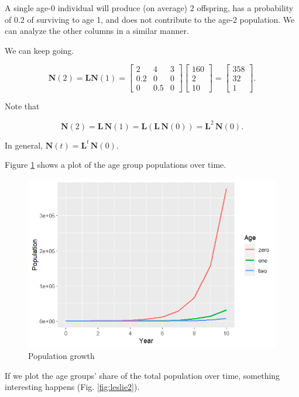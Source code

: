 \documentclass[
]{book}
\theoremstyle{definition}
\theoremstyle{definition}
\theoremstyle{definition}
\theoremstyle{definition}
\theoremstyle{remark}
\begin{document}
A single age-0 individual will produce (on average) 2 offspring, has a probability of 0.2 of surviving to age 1, and does not contribute to the age-2 population. We can analyze the other columns in a similar manner.

We can keep going.

\[\mathbf{N}(2)=\mathbf{L}\mathbf{N}(1)=\begin{bmatrix}2&4&3\\0.2&0&0\\0&0.5&0\end{bmatrix}\begin{bmatrix}160\\2\\10\end{bmatrix}=\begin{bmatrix}358\\32\\1\end{bmatrix}.\]

Note that

\[\mathbf{N}(2)=\mathbf{L}\,\mathbf{N}(1)=\mathbf{L}(\mathbf{L}\,\mathbf{N}(0))=\mathbf{L}^2\,\mathbf{N}(0).\]

In general, \(\mathbf{N}(t)=\mathbf{L}^t\,\mathbf{N}(0)\).

Figure \ref{fig:leslie1} shows a plot of the age group populations over time.

\begin{figure}

{\centering \includegraphics[width=0.75\linewidth]{images/leslie1} 

}

\caption{Population growth}\label{fig:leslie1}
\end{figure}

If we plot the age groups' share of the total population over time, something interesting happens (Fig. \ref{fig:leslie2}).
\end{document}
